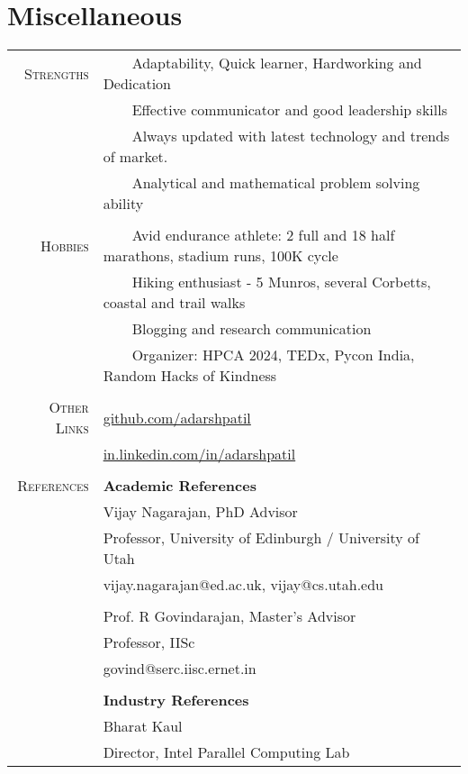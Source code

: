 \documentclass[a4paper,10pt]{article} %
\newcommand{\tabitem}{~~\llap{\textbullet}~~}
\begin{document}

\section{Miscellaneous}
\begin{tabular}{rl}
\textsc{Strengths} & \tabitem Adaptability, Quick learner, Hardworking and Dedication\\
& \tabitem Effective communicator and good leadership skills \\
& \tabitem Always updated with latest technology and trends of market.\\
& \tabitem Analytical and mathematical problem solving ability \\
& \\
\textsc{Hobbies} & \tabitem Avid endurance athlete: 2 full and 18 half marathons, stadium runs, 100K cycle\\
& \tabitem Hiking enthusiast - 5 Munros, several Corbetts, coastal and trail walks\\
& \tabitem Blogging and research communication \\
& \tabitem Organizer:  HPCA 2024, TEDx, Pycon India, Random Hacks of Kindness\\
& \\
\textsc{Other Links} & \href{https://github.com/adarshpatil}{github.com/adarshpatil} \\
& \href{https://in.linkedin.com/in/adarshpatil}{in.linkedin.com/in/adarshpatil}\\
&\\
\textsc{References} & \textbf{Academic References} \\
& Vijay Nagarajan, PhD Advisor \\
& Professor, University of Edinburgh / University of Utah\\
& vijay.nagarajan@ed.ac.uk, vijay@cs.utah.edu\\
&\\
& Prof. R Govindarajan, Master's Advisor \\
& Professor, IISc\\
& govind@serc.iisc.ernet.in \\
&\\

& \textbf{Industry References} \\
& Bharat Kaul \\
& Director, Intel Parallel Computing Lab \\
\end{tabular}
\end{document}
